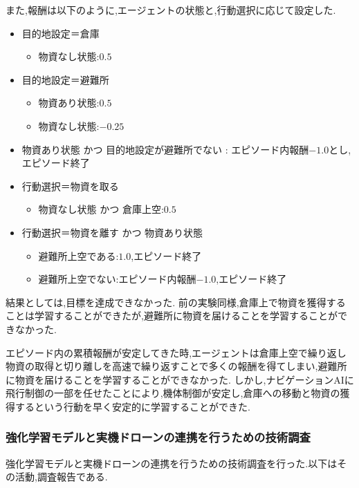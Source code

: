 \documentclass{article}[jsarticle]
\begin{document}
また,報酬は以下のように,エージェントの状態と,行動選択に応じて設定した.
\begin{itemize}
    \item 目的地設定＝倉庫
    \begin{itemize}
        \item 物資なし状態:$0.5$
    \end{itemize}
    \item 目的地設定＝避難所
    \begin{itemize}
        \item 物資あり状態:$0.5$
        \item 物資なし状態:$-0.25$
    \end{itemize}
    \item 物資あり状態 かつ 目的地設定が避難所でない : エピソード内報酬$-1.0$とし,エピソード終了
    \item 行動選択＝物資を取る
    \begin{itemize}
        \item 物資なし状態 かつ 倉庫上空:$0.5$
    \end{itemize}
    \item 行動選択＝物資を離す かつ 物資あり状態
    \begin{itemize}
        \item 避難所上空である:$1.0$,エピソード終了
        \item 避難所上空でない:エピソード内報酬$-1.0$,エピソード終了
    \end{itemize}
\end{itemize}
結果としては,目標を達成できなかった.
前の実験同様,倉庫上で物資を獲得することは学習することができたが,避難所に物資を届けることを学習することができなかった.\par 
エピソード内の累積報酬が安定してきた時,エージェントは倉庫上空で繰り返し物資の取得と切り離しを高速で繰り返すことで多くの報酬を得てしまい,避難所に物資を届けることを学習することができなかった.
しかし,ナビゲーションAIに飛行制御の一部を任せたことにより,機体制御が安定し,倉庫への移動と物資の獲得するという行動を早く安定的に学習することができた.\par 

\subsubsection{強化学習モデルと実機ドローンの連携を行うための技術調査}
強化学習モデルと実機ドローンの連携を行うための技術調査を行った.以下はその活動,調査報告である.
\end{document}
